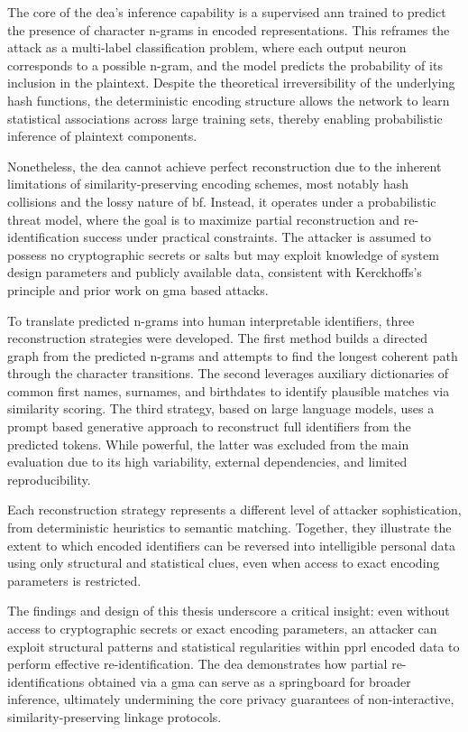 The core of the \ac{dea}’s inference capability is a supervised \ac{ann} trained to predict the presence of character n-grams in encoded representations.
This reframes the attack as a multi-label classification problem, where each output neuron corresponds to a possible n-gram, and the model predicts the probability of its inclusion in the plaintext.
Despite the theoretical irreversibility of the underlying hash functions, the deterministic encoding structure allows the network to learn statistical associations across large training sets, thereby enabling probabilistic inference of plaintext components.

Nonetheless, the \ac{dea} cannot achieve perfect reconstruction due to the inherent limitations of similarity-preserving encoding schemes, most notably hash collisions and the lossy nature of \ac{bf}.
Instead, it operates under a probabilistic threat model, where the goal is to maximize partial reconstruction and re-identification success under practical constraints.
The attacker is assumed to possess no cryptographic secrets or salts but may exploit knowledge of system design parameters and publicly available data, consistent with Kerckhoffs’s principle and prior work on \ac{gma} based attacks.

To translate predicted n-grams into human interpretable identifiers, three reconstruction strategies were developed.
The first method builds a directed graph from the predicted n-grams and attempts to find the longest coherent path through the character transitions.
The second leverages auxiliary dictionaries of common first names, surnames, and birthdates to identify plausible matches via similarity scoring.
The third strategy, based on large language models, uses a prompt based generative approach to reconstruct full identifiers from the predicted tokens.
While powerful, the latter was excluded from the main evaluation due to its high variability, external dependencies, and limited reproducibility.

Each reconstruction strategy represents a different level of attacker sophistication, from deterministic heuristics to semantic matching.
Together, they illustrate the extent to which encoded identifiers can be reversed into intelligible personal data using only structural and statistical clues, even when access to exact encoding parameters is restricted.

The findings and design of this thesis underscore a critical insight: even without access to cryptographic secrets or exact encoding parameters, an attacker can exploit structural patterns and statistical regularities within \ac{pprl} encoded data to perform effective re-identification.
The \ac{dea} demonstrates how partial re-identifications obtained via a \ac{gma} can serve as a springboard for broader inference, ultimately undermining the core privacy guarantees of non-interactive, similarity-preserving linkage protocols.

